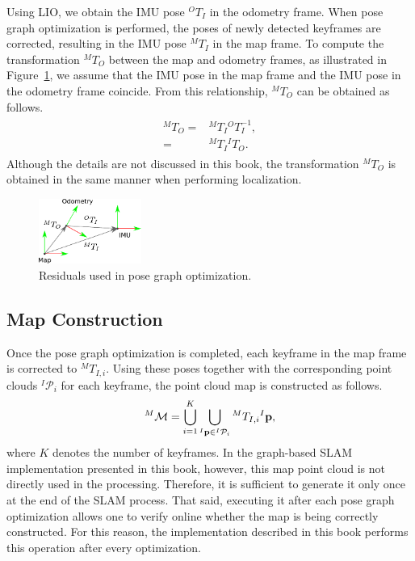 Using LIO, we obtain the IMU pose ${}^{O}T_{I}$ in the odometry frame.
When pose graph optimization is performed, the poses of newly detected keyframes are corrected, resulting in the IMU pose ${}^{M}T_{I}$ in the map frame.
To compute the transformation ${}^{M}T_{O}$ between the map and odometry frames, as illustrated in Figure~\ref{fig:map_odom_transformation}, we assume that the IMU pose in the map frame and the IMU pose in the odometry frame coincide.
From this relationship, ${}^{M}T_{O}$ can be obtained as follows.
%
\begin{align}
  \begin{split}
    {}^{M}T_{O} = & {}^{M}T_{I} {}^{O}T_{I}^{-1}, \\
                = & {}^{M}T_{I} {}^{I}T_{O}.
  \end{split}
\end{align}
%
Although the details are not discussed in this book, the transformation ${}^{M}T_{O}$ is obtained in the same manner when performing localization.

\begin{figure}[!t]
  \centering
  \includegraphics[width=0.3\textwidth]{../figs/map_odom_transformation.pdf}
  \caption{Residuals used in pose graph optimization.}
  \label{fig:map_odom_transformation}
\end{figure}



\subsection{Map Construction}

Once the pose graph optimization is completed, each keyframe in the map frame is corrected to ${}^{M}T_{I, i}$.
Using these poses together with the corresponding point clouds ${}^{I}\mathcal{P}_{i}$ for each keyframe, the point cloud map is constructed as follows.
%
\begin{align}
  {}^{M}\mathcal{M} = \bigcup_{i=1}^{K} \bigcup_{{}^{I}{\bf p} \in {}^{I}\mathcal{P}_{i}} {}^{M}T_{I, i} {}^{I}{\bf p},
\end{align}
%
where $K$ denotes the number of keyframes.
In the graph-based SLAM implementation presented in this book, however, this map point cloud is not directly used in the processing.
Therefore, it is sufficient to generate it only once at the end of the SLAM process.
That said, executing it after each pose graph optimization allows one to verify online whether the map is being correctly constructed.
For this reason, the implementation described in this book performs this operation after every optimization.










